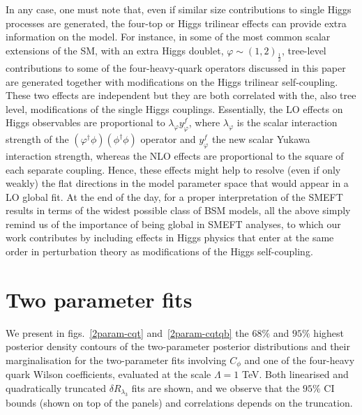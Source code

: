 %
In any case, one must note that, even if similar size contributions to single Higgs processes are generated, the four-top or Higgs trilinear effects can provide extra information on the model.
%
For instance, in some of the most common scalar extensions of the SM, with an extra Higgs doublet, $\varphi\sim (1,2)_{\frac 12}$, tree-level contributions to some of the four-heavy-quark operators discussed in this paper are generated together with modifications on the Higgs trilinear self-coupling.
These two effects are independent but they are both correlated with the, also tree level, modifications of the single Higgs couplings. Essentially, the LO effects on Higgs observables are proportional to $\lambda_\varphi y_\varphi^f$, where $\lambda_\varphi $ is the scalar interaction strength of the $(\varphi^\dagger \phi)(\phi^\dagger \phi)$ operator and $y_\varphi^f$ the new scalar Yukawa interaction strength, whereas the NLO effects are proportional to the square of each separate coupling. Hence, these effects might help to resolve (even if only weakly) the flat directions in the model parameter space that would appear in a LO global fit.
%
At the end of the day, for a proper interpretation of the SMEFT results in terms of the widest possible class of BSM models, all the above simply remind us of the importance of being global in SMEFT analyses, to which our work contributes by including effects in Higgs physics that enter at the same order in perturbation theory as modifications of the Higgs self-coupling.
\section{Two parameter fits \label{App:fitplots}}

We present in figs.~\ref{2param-cqt} and~\ref{2param-cqtqb} the $68\%$ and $ 95\%$  highest posterior density contours of the two-parameter posterior distributions and their marginalisation for the two-parameter fits involving $C_\phi$ and one of the four-heavy quark Wilson coefficients, evaluated at the scale $\Lambda=1$ TeV.  
Both linearised and quadratically truncated $\delta R_{\lambda_3}$ fits are shown, and we observe that the $95\%$ CI bounds (shown on top of the panels) and correlations depends on the truncation.

